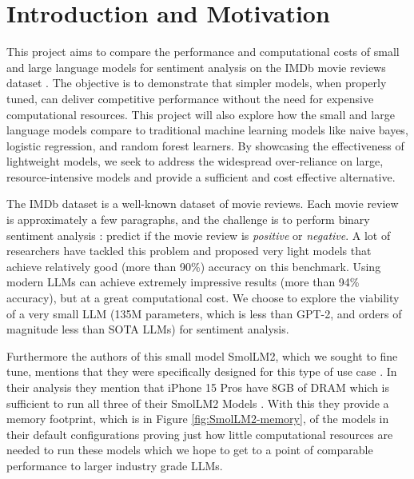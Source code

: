 \documentclass[10pt,twocolumn,letterpaper]{article}
\begin{document}
\section{Introduction and Motivation}


This project aims to compare the performance and computational costs of small and large language models for sentiment analysis on the IMDb movie reviews dataset \cite{IMDB-dataset}. The objective is to demonstrate that simpler models, when properly tuned, can deliver competitive performance without the need for expensive computational resources.  This project will also explore how the small and large language models compare to traditional machine learning models like naive bayes, logistic regression, and random forest learners. By showcasing the effectiveness of lightweight models, we seek to address the widespread over-reliance on large, resource-intensive models and provide a sufficient and cost effective alternative. 

The IMDb dataset is a well-known dataset of movie reviews. Each movie review is approximately a few paragraphs, and the challenge is to perform binary sentiment analysis : predict if the movie review is \textit{positive} or \textit{negative}. A lot of researchers have tackled this problem and proposed very light models that achieve relatively good (more than 90\%) accuracy on this benchmark. Using modern LLMs can achieve extremely impressive results (more than 94\% accuracy), but at a great computational cost. We choose to explore the viability of a very small LLM (135M parameters, which is less than GPT-2, and orders of magnitude less than SOTA LLMs) for sentiment analysis.

Furthermore the authors of this small model SmolLM2, which we sought to fine tune, mentions that they were specifically designed for this type of use case \cite{hf-SmolLM2-usecase}. In their analysis they mention that iPhone 15 Pros have 8GB of DRAM which is sufficient to run all three of their SmolLM2 Models \cite{hf-SmolLM2-collection}. With this they provide a memory footprint, which is in Figure \ref{fig:SmolLM2-memory}, of the models in their default configurations proving just how little computational resources are needed to run these models which we hope to get to a point of comparable performance to larger industry grade LLMs.
\end{document}
